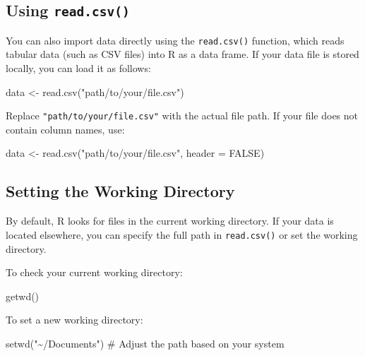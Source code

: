 \documentclass[
  11pt,
]{book}
\makeatletter
\newenvironment{Shaded}{}{}
\newcommand{\AttributeTok}[1]{#1}
\newcommand{\CommentTok}[1]{\textcolor[rgb]{0.36,0.36,0.36}{#1}}
\newcommand{\ConstantTok}[1]{#1}
\newcommand{\FunctionTok}[1]{#1}
\newcommand{\NormalTok}[1]{#1}
\newcommand{\OtherTok}[1]{\textcolor[rgb]{0.39,0.39,0.39}{#1}}
\newcommand{\StringTok}[1]{\textcolor[rgb]{0.39,0.39,0.39}{#1}}
\newenvironment{kframe}{%
\medskip{}
\setlength{\fboxsep}{.8em}
 \def\at@end@of@kframe{}%
 \ifinner\ifhmode%
  \def\at@end@of@kframe{\end{minipage}}%
  \begin{minipage}{\columnwidth}%
 \fi\fi%
 \def\FrameCommand##1{\hskip\@totalleftmargin \hskip-\fboxsep
 \colorbox{shadecolor}{##1}\hskip-\fboxsep
     \hskip-\linewidth \hskip-\@totalleftmargin \hskip\columnwidth}%
 \MakeFramed {\advance\hsize-\width
   \@totalleftmargin\z@ \linewidth\hsize
   \@setminipage}}%
 {\par\unskip\endMakeFramed%
 \at@end@of@kframe}
\renewenvironment{Shaded}{\begin{kframe}}{\end{kframe}}
\theoremstyle{definition}
\theoremstyle{definition}
\theoremstyle{definition}
\theoremstyle{definition}
\theoremstyle{remark}
\makeatother
\begin{document}
\subsection*{\texorpdfstring{Using \texttt{read.csv()}}{Using read.csv()}}\label{using-read.csv}


You can also import data directly using the \texttt{read.csv()} function, which reads tabular data (such as CSV files) into R as a data frame. If your data file is stored locally, you can load it as follows:

\begin{Shaded}
\begin{Highlighting}[]
\NormalTok{data }\OtherTok{\textless{}{-}} \FunctionTok{read.csv}\NormalTok{(}\StringTok{"path/to/your/file.csv"}\NormalTok{)}
\end{Highlighting}
\end{Shaded}

Replace \texttt{"path/to/your/file.csv"} with the actual file path. If your file does not contain column names, use:

\begin{Shaded}
\begin{Highlighting}[]
\NormalTok{data }\OtherTok{\textless{}{-}} \FunctionTok{read.csv}\NormalTok{(}\StringTok{"path/to/your/file.csv"}\NormalTok{, }\AttributeTok{header =} \ConstantTok{FALSE}\NormalTok{)}
\end{Highlighting}
\end{Shaded}

\subsection*{Setting the Working Directory}\label{setting-the-working-directory}


By default, R looks for files in the current working directory. If your data is located elsewhere, you can specify the full path in \texttt{read.csv()} or set the working directory.

To check your current working directory:

\begin{Shaded}
\begin{Highlighting}[]
\FunctionTok{getwd}\NormalTok{()}
\end{Highlighting}
\end{Shaded}

To set a new working directory:

\begin{Shaded}
\begin{Highlighting}[]
\FunctionTok{setwd}\NormalTok{(}\StringTok{"\textasciitilde{}/Documents"}\NormalTok{)  }\CommentTok{\# Adjust the path based on your system}
\end{Highlighting}
\end{Shaded}
\end{document}
